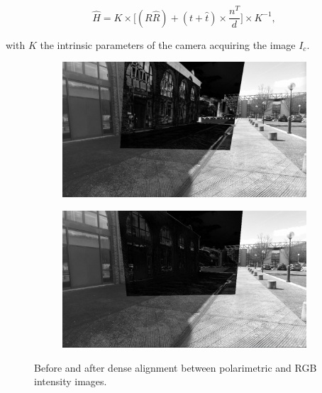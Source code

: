 \begin{equation}
\hat{H} = K \times \bigg[ (R\hat{R}) + (t + \hat{t}) \times \frac{n^T}{d} \bigg] \times K^{-1},
\end{equation}

with $K$ the intrinsic parameters of the camera acquiring the image $I_c$.

\begin{figure}[h]
	\centering
	\begin{subfigure}{.4\textwidth}
		\centering
		\includegraphics[width=\linewidth]{Figures/Dataset/beforealign.png}
	\end{subfigure}
	\begin{subfigure}{.4\textwidth}
		
		\centering
		\includegraphics[width=\linewidth]{Figures/Dataset/afteralign.png}
	\end{subfigure}
	\caption{Before and after dense alignment between polarimetric and RGB intensity images.}
	\label{fig:beforeafteralign}
\end{figure}


